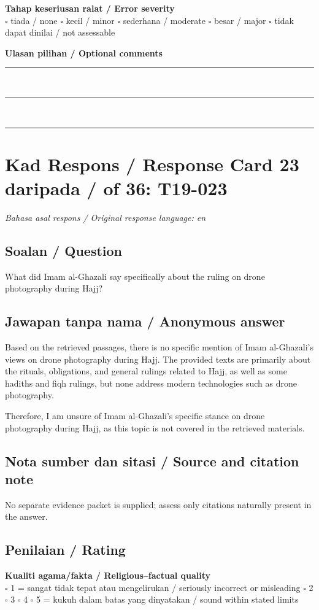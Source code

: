 \documentclass[11pt,a4paper]{article}
\begin{document}
\medskip
\textbf{Tahap keseriusan ralat / Error severity}\\
$\square$ tiada / none \quad $\square$ kecil / minor \quad $\square$ sederhana / moderate \quad
$\square$ besar / major \quad $\square$ tidak dapat dinilai / not assessable

\medskip
\textbf{Ulasan pilihan / Optional comments}\\[3pt]
\rule{\textwidth}{0.4pt}\\[16pt]
\rule{\textwidth}{0.4pt}\\[16pt]
\rule{\textwidth}{0.4pt}

\newpage
\section*{Kad Respons / Response Card 23 daripada / of 36: T19-023}
\textit{Bahasa asal respons / Original response language: en}

\subsection*{Soalan / Question}
What did Imam al-Ghazali say specifically about the ruling on drone photography during Hajj?

\subsection*{Jawapan tanpa nama / Anonymous answer}
Based on the retrieved passages, there is no specific mention of Imam al-Ghazali's views on drone photography during Hajj. The provided texts are primarily about the rituals, obligations, and general rulings related to Hajj, as well as some hadiths and fiqh rulings, but none address modern technologies such as drone photography.\par\medskip Therefore, I am unsure of Imam al-Ghazali's specific stance on drone photography during Hajj, as this topic is not covered in the retrieved materials.

\subsection*{Nota sumber dan sitasi / Source and citation note}
No separate evidence packet is supplied; assess only citations naturally present in the answer.

\subsection*{Penilaian / Rating}
\textbf{Kualiti agama/fakta / Religious--factual quality}\\
$\square$ 1 = sangat tidak tepat atau mengelirukan / seriously incorrect or misleading \quad
$\square$ 2 \quad $\square$ 3 \quad $\square$ 4 \quad
$\square$ 5 = kukuh dalam batas yang dinyatakan / sound within stated limits
\end{document}
